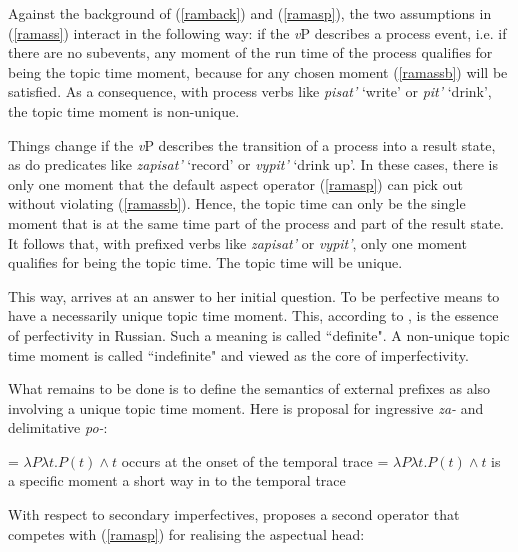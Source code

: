 \documentclass[output=paper,colorlinks,citecolor=brown]{langscibook}
\begin{document}
\noindent Against the background of (\ref{ramback}) and (\ref{ramasp}), the two assumptions in (\ref{ramass}) interact in the following way:
if the \textit{v}P describes a process event, i.e. if there are no subevents, any moment of the run time of the process qualifies for being the topic time moment, because for any chosen moment (\ref{ramassb}) will be satisfied. As a consequence, with process verbs like \textit{pisat'} `write' or \textit{pit'} `drink', the topic time moment is non-unique. 

Things change if the \textit{v}P describes the transition of a process into a result state, as do predicates like \textit{zapisat'} `record' or \textit{vypit'} `drink up'. In these cases, there is only one moment that the default aspect operator (\ref{ramasp}) can pick out without violating (\ref{ramassb}). Hence, 
the topic time can only be the single moment that is at the same time part of the process and part of the result state. It follows that, with prefixed verbs like \textit{zapisat'} or \textit{vypit'}, only one moment qualifies for being the topic time. The topic time will be unique. 

This way, \citet{Ramchand08} arrives at an answer to her initial question. To be perfective means to have a necessarily unique topic time moment. This, according to \citet{Ramchand08}, is the essence of perfectivity in Russian. Such a meaning is called ``definite". A non-unique topic time moment is called ``indefinite" and viewed as the core of imperfectivity.

What remains to be done is to define the semantics of external prefixes as also involving a unique topic time moment. Here is  proposal for ingressive \textit{za-} and delimitative \textit{po-}: 

\ea \label{grza}
\ea {} = $\lambda P \lambda t . P(t) \wedge t$ occurs at the onset of the temporal trace
\ex {} = $\lambda P \lambda t . P(t) \wedge t$ is a specific moment a short way in to the temporal trace
\z
\z

\noindent With respect to secondary imperfectives, \citet[1704]{Ramchand08} proposes a second operator that competes with (\ref{ramasp}) for realising the aspectual head:
\end{document}
